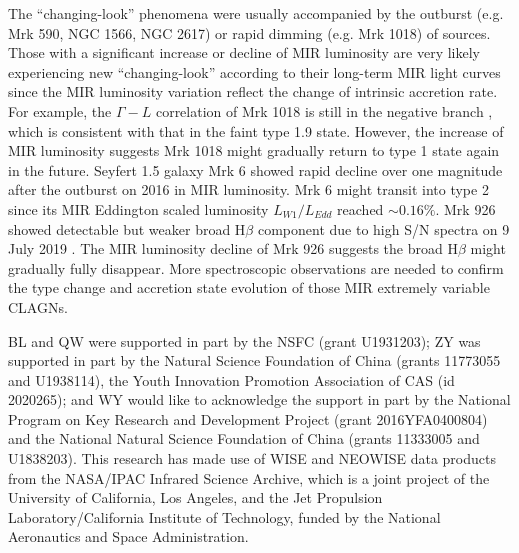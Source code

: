 \documentclass[linenumbers]{aastex631}
\begin{document}
The ``changing-look'' phenomena were usually accompanied by the outburst (e.g. Mrk 590, NGC 1566, NGC 2617) or rapid dimming (e.g. Mrk 1018) of sources. Those with a significant increase or decline of MIR luminosity are very likely experiencing new ``changing-look'' according to their long-term MIR light curves since the MIR luminosity variation reflect the change of intrinsic accretion rate. For example, the $\Gamma-L$ correlation of Mrk 1018 is still in the negative branch \citep{2021MNRAS.506.4188L}, which is consistent with that in the faint type 1.9 state. However, the increase of MIR luminosity suggests Mrk 1018 might gradually return to type 1 state again in the future. Seyfert 1.5 galaxy Mrk 6 showed rapid decline over one magnitude after the outburst on 2016 in MIR luminosity. Mrk 6 might transit into type 2 since its MIR Eddington scaled luminosity $L_{W1}/L_{Edd} $ reached $\sim 0.16\%$. Mrk 926 showed detectable but weaker broad H$\beta$ component due to high S/N spectra on 9 July 2019 \citep{2021IAUS..356..122W}. The MIR luminosity decline of Mrk 926 suggests the broad H$\beta$ might gradually fully disappear. More spectroscopic observations are needed to confirm the type change and accretion state evolution of those MIR extremely variable CLAGNs.



\begin{acknowledgments}
BL and QW were supported in part by the NSFC (grant U1931203); ZY was supported in part by the Natural Science Foundation of China (grants 11773055 and U1938114), the Youth Innovation Promotion Association of CAS (id 2020265); and WY would like to acknowledge the support in part by the National Program on Key Research and Development Project (grant 2016YFA0400804) and the National Natural Science Foundation of China (grants 11333005 and U1838203).
This research has made use of WISE and NEOWISE data products from the NASA/IPAC Infrared Science Archive, which is a joint project of the University of California, Los Angeles, and the Jet Propulsion Laboratory/California Institute of Technology, funded by the National Aeronautics and Space Administration. 



\end{acknowledgments}
\end{document}
